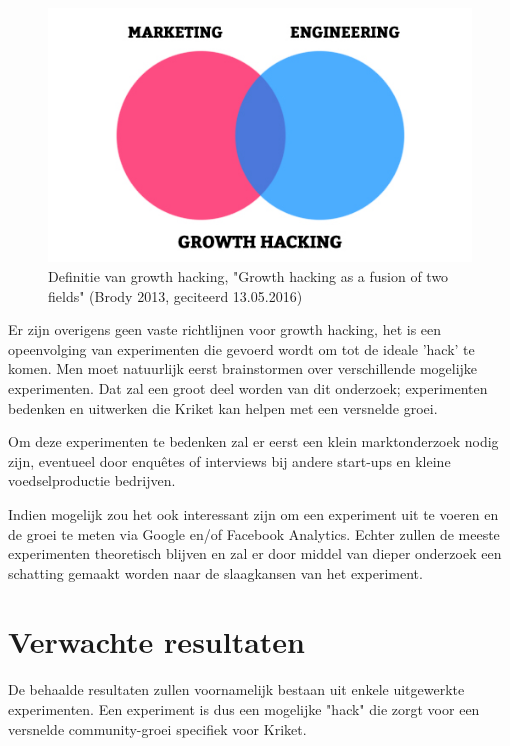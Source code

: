 \begin{figure}[h!]
	\includegraphics[width=\linewidth]{growth-hacker-definition.jpg}
	\caption{Definitie van growth hacking, "Growth hacking as a fusion of two fields"  (Brody 2013, geciteerd 13.05.2016)}
	\label{fig:defGrowthHacker}
\end{figure}

Er zijn overigens geen vaste richtlijnen voor growth hacking, het is een opeenvolging van experimenten die gevoerd wordt om tot de ideale 'hack' te komen. Men moet natuurlijk eerst brainstormen over verschillende mogelijke experimenten. Dat zal een groot deel worden van dit onderzoek; experimenten bedenken en uitwerken die Kriket kan helpen met een versnelde groei.

Om deze experimenten te bedenken zal er eerst een klein marktonderzoek nodig zijn, eventueel door enquêtes of interviews bij andere start-ups en kleine voedselproductie bedrijven. 

Indien mogelijk zou het ook interessant zijn om een experiment uit te voeren en de groei te meten via Google en/of Facebook Analytics. Echter zullen de meeste experimenten theoretisch blijven en zal er door middel van dieper onderzoek een schatting gemaakt worden naar de slaagkansen van het experiment.

\section{Verwachte resultaten}
\label{sec:verwachte_resultaten}

De behaalde resultaten zullen voornamelijk bestaan uit enkele uitgewerkte experimenten. Een experiment is dus een mogelijke "hack" die zorgt voor een versnelde community-groei specifiek voor Kriket. 

